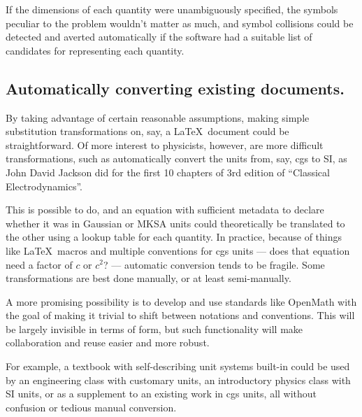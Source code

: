 \documentclass[12pt,letterpaper]{article}
\begin{document}
If the dimensions of each quantity were unambiguously specified,
the symbols peculiar to the problem wouldn't matter as much,
and symbol collisions could be detected and averted automatically
if the software had a suitable list of candidates for representing each quantity.


\subsection{Automatically converting existing documents.}

By taking advantage of certain reasonable assumptions,
making simple substitution transformations on, say,
a \LaTeX\ document could be straightforward.
Of more interest to physicists, however,
are more difficult transformations,
such as automatically convert the units from,
say, cgs to SI,
as John David Jackson did for the first 10 chapters of 3rd edition of ``Classical Electrodynamics''.

This is possible to do,
and an equation with sufficient metadata to declare whether it was in Gaussian or MKSA units
could theoretically be translated to the other using a lookup table for each quantity.
In practice,
because of things like \LaTeX\ macros and multiple conventions for cgs units
--- does that equation need a factor of $c$ or $c^2$? ---
automatic conversion tends to be fragile.
Some transformations are best done manually,
or at least semi-manually.


A more promising possibility is to develop and use standards like OpenMath
with the goal of making it trivial to shift between notations and conventions.
This will be largely invisible in terms of form,
but such functionality will make collaboration and reuse easier and more robust.

For example,
a textbook with self-describing unit systems built-in could be used by
an engineering class with customary units,
an introductory physics class with SI units,
or as a supplement to an existing work in cgs units,
all without confusion or tedious manual conversion.
\end{document}
